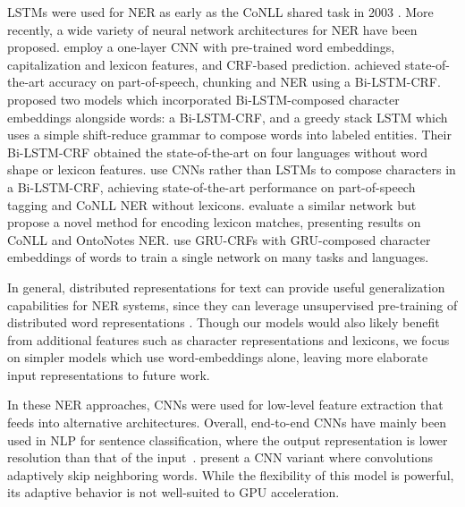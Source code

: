 LSTMs \citep{hochreiter1997long} were used for NER as early as the CoNLL shared task in 2003 \citep{hammerton2003named, tjong2003introduction}. More recently, a wide variety of neural network architectures for NER have been proposed. \citet{collobert2011natural} employ a one-layer CNN with pre-trained word embeddings, capitalization and lexicon features, and CRF-based prediction. \citet{huang2015bidirectional} achieved state-of-the-art accuracy on part-of-speech, chunking and NER using a Bi-LSTM-CRF. \citet{lample2016neural} proposed two models which incorporated Bi-LSTM-composed character embeddings alongside words: a Bi-LSTM-CRF, and a greedy stack LSTM which uses a simple shift-reduce grammar to compose words into labeled entities. Their Bi-LSTM-CRF obtained the state-of-the-art on four languages without word shape or lexicon features. \citet{ma2016end} use CNNs rather than LSTMs to compose characters in a Bi-LSTM-CRF, achieving state-of-the-art performance on part-of-speech tagging and CoNLL NER without lexicons. \citet{chiu2016named} evaluate a similar network but propose a novel method for encoding lexicon matches, presenting results on CoNLL and OntoNotes NER. \citet{yang2016multi} use GRU-CRFs with GRU-composed character embeddings of words to train a single network on many tasks and languages. 

In general, distributed representations for text can provide useful generalization capabilities for NER systems, since they can leverage unsupervised pre-training of distributed word representations \citep{turian2010word,collobert2011natural,passos2014lexicon}. Though our models would also likely benefit from additional features such as character representations and lexicons, we focus on simpler models which use word-embeddings alone, leaving more elaborate input representations to future work. 

In these NER approaches, CNNs were used for low-level feature extraction that feeds into alternative architectures. Overall, end-to-end CNNs have mainly been used in NLP for sentence classification, where the output representation is lower resolution than that of the input~\citet{kim2014convolutional,kalchbrenner2014convolutional,zhang2015character,toutanova2015representing}. \citet{lei2015molding} present a CNN variant where convolutions adaptively skip neighboring words. While the flexibility of this model is powerful, its adaptive behavior is not well-suited to GPU acceleration. 


